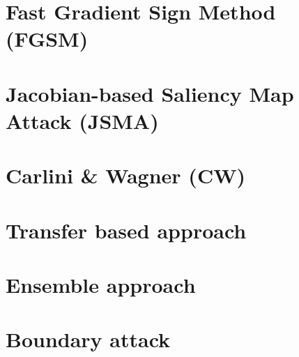 \section{Fast Gradient Sign Method (FGSM)}
\label{sec:FGSM}



\section{Jacobian-based Saliency Map Attack (JSMA)}
\label{sec:JSMA}


 
\section{Carlini \& Wagner (CW)}
\label{sec:CW}



\section{Transfer based approach}
\label{sec:transfer-based}



\section{Ensemble approach} 
\label{sec:ensemble-approach}



\section{Boundary attack}
\label{sec:boundary-attack}

